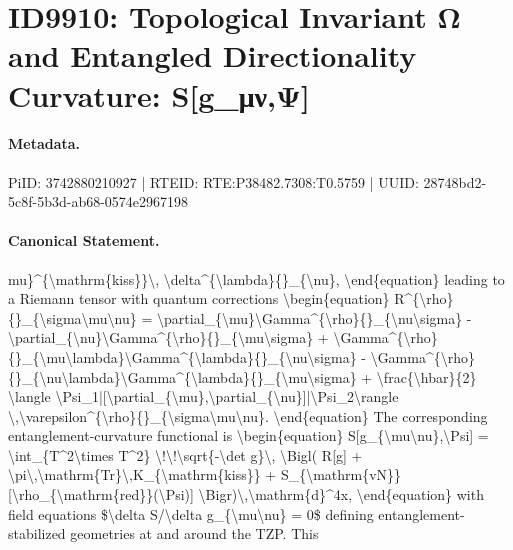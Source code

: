\section*{ID9910: Topological Invariant Ω and Entangled Directionality Curvature: S[g\_μν,Ψ]}
\paragraph{Metadata.}
PiID: 3742880210927 | RTEID: RTE:P38482.7308:T0.5759 | UUID: 28748bd2-5c8f-5b3d-ab68-0574e2967198

\paragraph{Canonical Statement.}
mu\}\textasciicircum{}\{\textbackslash{}mathrm\{kiss\}\}\textbackslash{}, \textbackslash{}delta\textasciicircum{}\{\textbackslash{}lambda\}\{\}\_\{\textbackslash{}nu\}, \textbackslash{}end\{equation\} leading to a Riemann tensor with quantum corrections \textbackslash{}begin\{equation\} R\textasciicircum{}\{\textbackslash{}rho\}\{\}\_\{\textbackslash{}sigma\textbackslash{}mu\textbackslash{}nu\} = \textbackslash{}partial\_\{\textbackslash{}mu\}\textbackslash{}Gamma\textasciicircum{}\{\textbackslash{}rho\}\{\}\_\{\textbackslash{}nu\textbackslash{}sigma\} - \textbackslash{}partial\_\{\textbackslash{}nu\}\textbackslash{}Gamma\textasciicircum{}\{\textbackslash{}rho\}\{\}\_\{\textbackslash{}mu\textbackslash{}sigma\} + \textbackslash{}Gamma\textasciicircum{}\{\textbackslash{}rho\}\{\}\_\{\textbackslash{}mu\textbackslash{}lambda\}\textbackslash{}Gamma\textasciicircum{}\{\textbackslash{}lambda\}\{\}\_\{\textbackslash{}nu\textbackslash{}sigma\} - \textbackslash{}Gamma\textasciicircum{}\{\textbackslash{}rho\}\{\}\_\{\textbackslash{}nu\textbackslash{}lambda\}\textbackslash{}Gamma\textasciicircum{}\{\textbackslash{}lambda\}\{\}\_\{\textbackslash{}mu\textbackslash{}sigma\} + \textbackslash{}frac\{\textbackslash{}hbar\}\{2\} \textbackslash{}langle \textbackslash{}Psi\_1|[\textbackslash{}partial\_\{\textbackslash{}mu\},\textbackslash{}partial\_\{\textbackslash{}nu\}]|\textbackslash{}Psi\_2\textbackslash{}rangle \textbackslash{},\textbackslash{}varepsilon\textasciicircum{}\{\textbackslash{}rho\}\{\}\_\{\textbackslash{}sigma\textbackslash{}mu\textbackslash{}nu\}. \textbackslash{}end\{equation\} The corresponding entanglement-curvature functional is \textbackslash{}begin\{equation\} S[g\_\{\textbackslash{}mu\textbackslash{}nu\},\textbackslash{}Psi] = \textbackslash{}int\_\{T\textasciicircum{}2\textbackslash{}times T\textasciicircum{}2\} \textbackslash{}!\textbackslash{}!\textbackslash{}sqrt\{-\textbackslash{}det g\}\textbackslash{}, \textbackslash{}Bigl( R[g] + \textbackslash{}pi\textbackslash{},\textbackslash{}mathrm\{Tr\}\textbackslash{},K\_\{\textbackslash{}mathrm\{kiss\}\} + S\_\{\textbackslash{}mathrm\{vN\}\}[\textbackslash{}rho\_\{\textbackslash{}mathrm\{red\}\}(\textbackslash{}Psi)] \textbackslash{}Bigr)\textbackslash{},\textbackslash{}mathrm\{d\}\textasciicircum{}4x, \textbackslash{}end\{equation\} with field equations \$\textbackslash{}delta S/\textbackslash{}delta g\_\{\textbackslash{}mu\textbackslash{}nu\} = 0\$ defining entanglement-stabilized geometries at and around the TZP. This 